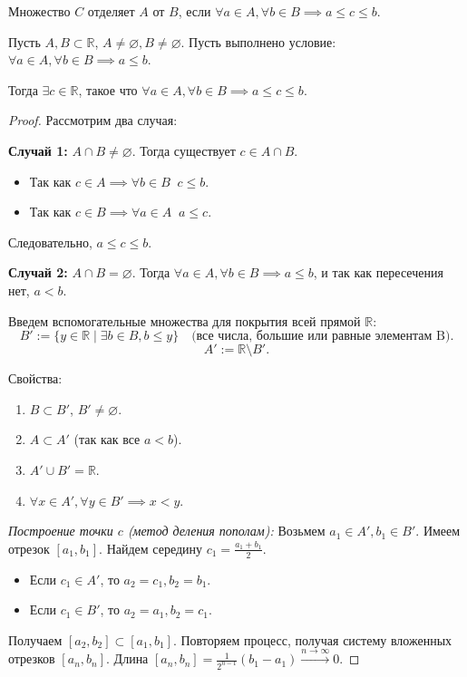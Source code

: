 \begin{definition}[Отделимость]
    Множество $C$ отделяет $A$ от $B$, если $\forall a \in A, \forall b \in B \implies a \le c \le b$.
\end{definition}

\begin{lemma}[Об отделимости]
    Пусть $A, B \subset \mathbb{R}$, $A \neq \varnothing, B \neq \varnothing$.
    Пусть выполнено условие: $\forall a \in A, \forall b \in B \implies a \le b$.
    
    Тогда $\exists c \in \mathbb{R}$, такое что $\forall a \in A, \forall b \in B \implies a \le c \le b$.
\end{lemma}

\begin{proof}
    Рассмотрим два случая:
    
    \textbf{Случай 1:} $A \cap B \neq \varnothing$.
    Тогда существует $c \in A \cap B$.
    \begin{itemize}
        \item Так как $c \in A \implies \forall b \in B \;\; c \le b$.
        \item Так как $c \in B \implies \forall a \in A \;\; a \le c$.
    \end{itemize}
    Следовательно, $a \le c \le b$.

    \textbf{Случай 2:} $A \cap B = \varnothing$.
    Тогда $\forall a \in A, \forall b \in B \implies a \le b$, и так как пересечения нет, $a < b$.
    
    Введем вспомогательные множества для покрытия всей прямой $\mathbb{R}$:
    \[ B' := \{ y \in \mathbb{R} \mid \exists b \in B, b \le y \} \quad \text{(все числа, большие или равные элементам B)}. \]
    \[ A' := \mathbb{R} \setminus B'. \]
    
    Свойства:
    \begin{enumerate}
        \item $B \subset B'$, $B' \neq \varnothing$.
        \item $A \subset A'$ (так как все $a < b$).
        \item $A' \cup B' = \mathbb{R}$.
        \item $\forall x \in A', \forall y \in B' \implies x < y$.
    \end{enumerate}

    \textit{Построение точки $c$ (метод деления пополам):}
    Возьмем $a_1 \in A', b_1 \in B'$. Имеем отрезок $[a_1, b_1]$.
    Найдем середину $c_1 = \frac{a_1 + b_1}{2}$.
    \begin{itemize}
        \item Если $c_1 \in A'$, то $a_2 = c_1, b_2 = b_1$.
        \item Если $c_1 \in B'$, то $a_2 = a_1, b_2 = c_1$.
    \end{itemize}
    Получаем $[a_2, b_2] \subset [a_1, b_1]$. Повторяем процесс, получая систему вложенных отрезков $[a_n, b_n]$.
    Длина $[a_n, b_n] = \frac{1}{2^{n-1}}(b_1 - a_1) \xrightarrow{n \to \infty} 0$.
    

\end{proof}
